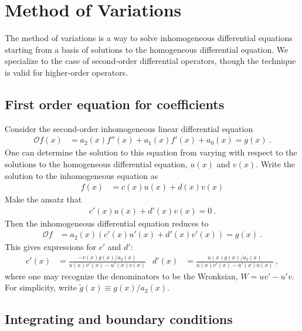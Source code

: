 \section{Method of Variations}
\label{app:method:of:variations}

The method of variations is a way to solve inhomogeneous differential equations starting from a basis of solutions to the homogeneous differential equation. We specialize to the case of second-order differential operators, though the technique is valid for higher-order operators.

\subsection{First order equation for coefficients}

Consider the second-order inhomogeneous linear differential equation
\begin{align}
	\mathcal Of(x) &= a_2(x)f''(x) + a_1(x) f'(x) + a_0(x) = g(x) \ .
\end{align}
One can determine the solution to this equation from varying with respect to the solutions to the homogeneous differential equation, $u(x)$ and $v(x)$. Write the solution to the inhomogeneous equation as
\begin{align}
	f(x) &= c(x)u(x) + d(x)v(x)
\end{align}
Make the ansatz that
\begin{align}
	c'(x) u(x) + d'(x) v(x) = 0 \ .
	\label{eq:method:of:variations:ansatz}
\end{align}
Then the inhomogeneous differential equation reduces to
\begin{align}
	\mathcal Of &= a_2(x)\left(c'(x) u'(x) + d'(x) v'(x)\right) =g(x) \ .
\end{align}
This gives expressions for $c'$ and $d'$:
\begin{align}
	c'(x) &= \frac{-v(x)g(x)/a_2(x)}{u(x) v'(x) - u'(x) v(x)}
	&
	d'(x) &= \frac{u(x)g(x)/a_2(x)}{u(x) v'(x) - u'(x) u(x)} \ ,
	\label{eq:method:of:variations:first:order}
\end{align}
where one may recognize the denominators to be the Wronksian, $W = uv' - u'v$. For simplicity, write $\tilde g(x) \equiv g(x)/a_2(x)$.

\subsection{Integrating and boundary conditions}

